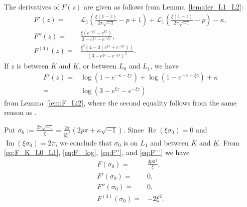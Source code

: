 \documentclass[a4paper,dvipdfmx]{amsart}
\theoremstyle{plain}
\theoremstyle{definition}
\theoremstyle{remark}
\renewcommand{\L}{\mathcal{L}}
\renewcommand{\Re}{\operatorname{Re}}
\renewcommand{\Im}{\operatorname{Im}}
\renewcommand{\i}{\sqrt{-1}}
\newcommand{\saddle}{\sigma}
\numberwithin{equation}{section}
\begin{document}
\par
The derivatives of $F(z)$ are given as follows from Lemma~\ref{lem:der_L1_L2}:
\begin{align}
  F'(z)
  =&
  \L_1\left(\frac{\xi(1-z)}{2\pi\i}-p+1\right)
  +
  \L_1\left(\frac{\xi(1+z)}{2\pi\i}-p\right)
  -\kappa,
  \label{eq:F'}
  \\
  F''(z)
  =&
  \frac{\xi\left(e^{-\xi z}-e^{\xi z}\right)}{3-e^{\xi z}-e^{-\xi z}},
  \label{eq:F''}
  \\
  F^{(3)}(z)
  =&
  \frac{\xi^2(4-3(e^{\xi z}+e^{-\xi z}))}{(3-e^{\xi z}-e^{-\xi z})^2}.
  \label{eq:F'''}
\end{align}
If $z$ is between $\overline{K}$ and $\underline{K}$, or between $L_0$ and $L_1$, we have
\begin{equation}\label{eq:F'_log}
\begin{split}
  F'(z)
  =&
  \log(1-e^{-\kappa-\xi z})
  +
  \log(1-e^{-\kappa+\xi z})
  +\kappa
  \\
  =&
  \log\left(3-e^{\xi z}-e^{-\xi z}\right)
\end{split}
\end{equation}
from Lemma~\ref{lem:F_Li2}, where the second equality follows from the same reason as \cite[Equation~(4.2)]{Murakami:CANJM2023}.
\par
Put $\saddle_{0}:=\frac{2\pi\i}{\xi}=\frac{2\pi}{|\xi|^2}(2p\pi+\kappa\i)$.
Since $\Re(\xi\saddle_0)=0$ and $\Im(\xi\saddle_0)=2\pi$, we conclude that $\saddle_0$ is on $L_1$ and between $\overline{K}$ and $\underline{K}$.
From \eqref{eq:F_K_L0_L1}, \eqref{eq:F'_log}, \eqref{eq:F''}, and \eqref{eq:F'''} we have
\begin{equation}\label{eq:F_derivatives}
\begin{split}
  F(\saddle_0)
  =&
  \frac{4p\pi^2}{\xi},
  \\
  F'(\saddle_{0})
  =&0,
  \\
  F''(\saddle_{0})
  =&
  0,
  \\
  F^{(3)}(\saddle_{0})
  =&
  -2\xi^2.
\end{split}
\end{equation}
\end{document}
